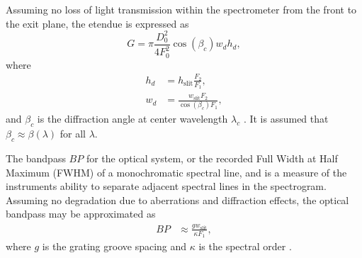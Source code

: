 Assuming no loss of light transmission within the spectrometer from the front to the exit plane, the etendue is expressed as
\begin{equation}
G = \pi \frac{D_0^2}{4 F_0^2}\cos(\beta_c) w_{d} h_{d},
\end{equation}
\noindent where
\begin{subequations}
\begin{align}
h_{d} &= h_{\text{slit}}\frac{F_2}{F_1}, \label{eq:effective_height}\\
w_{d} &= \frac{w_{\text{slit}}F_2}{\cos(\beta_c)F_1} \label{eq:effective_width},
\end{align}
\end{subequations}
\noindent and $\beta_c$ is the diffraction angle at center wavelength $\lambda_c$ \cite{Lerner2006}. It is assumed that $\beta_c\approx\beta(\lambda)$ for all $\lambda$.

The bandpass $BP$ for the optical system, or the recorded Full Width at Half Maximum (FWHM) of a monochromatic spectral
line, and is a measure of the instruments ability to separate adjacent spectral lines in the
spectrogram. Assuming no degradation due to aberrations and diffraction effects, the optical bandpass may be approximated as
\begin{align}
BP &\approx\frac{g w_{\text{slit}}}{\kappa F_1}, \label{eq:bp}
\end{align}
\noindent where $g$ is the grating groove spacing and $\kappa$ is the spectral order \cite{Lerner2006}. 
